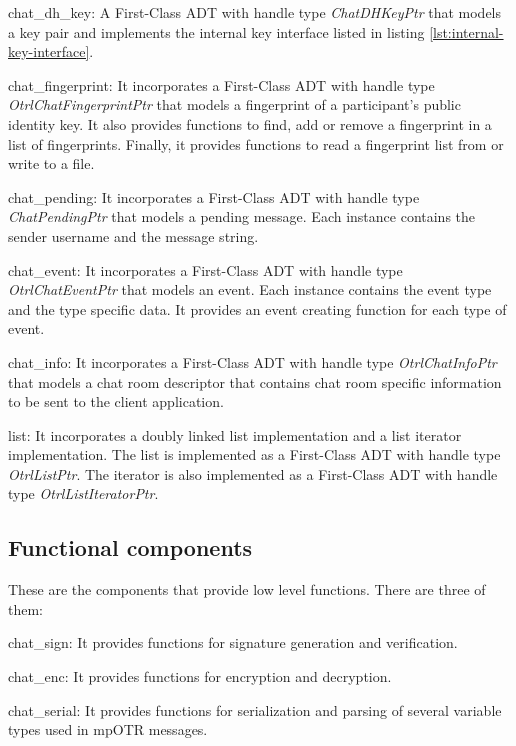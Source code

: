 \begin{description}
  \item chat\_dh\_key: A First-Class ADT with handle type \emph{ChatDHKeyPtr} that models a \dhname key pair and implements the internal key interface listed in listing \ref{lst:internal-key-interface}.

  \item chat\_fingerprint: It incorporates a First-Class ADT with handle type \emph{OtrlChatFingerprintPtr} that models a fingerprint of a participant's public identity key. It also provides functions to find, add or remove a fingerprint in a list of fingerprints. Finally, it provides functions to read a fingerprint list from or write to a file.

  \item chat\_pending: It incorporates a First-Class ADT with handle type \emph{ChatPendingPtr} that models a pending message. Each instance contains the sender username and the message string.
  
  \item chat\_event: It incorporates a First-Class ADT with handle type \emph{OtrlChatEventPtr} that models an event. Each instance contains the event type and the type specific data. It provides an event creating function for each type of event.

  \item chat\_info:  It incorporates a First-Class ADT with handle type \emph{OtrlChatInfoPtr} that models a chat room descriptor that contains chat room specific information to be sent to the client application.
  
  \item{list}: It incorporates a doubly linked list implementation and a list iterator implementation. The list is implemented as a First-Class ADT with handle type \emph{OtrlListPtr}. The iterator is also implemented as a First-Class ADT with handle type \emph{OtrlListIteratorPtr}.
\end{description}


\subsection{Functional components}
These are the components that provide low level functions. There are three of them:

\begin{description}
  \item chat\_sign: It provides functions for signature generation and verification.

  \item chat\_enc: It provides functions for encryption and decryption.

  \item chat\_serial: It provides functions for serialization and parsing of several variable types used in mpOTR messages. 
\end{description}


